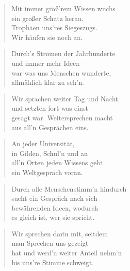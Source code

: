 \documentclass[10pt,a4paper]{article}
\begin{document}
\begin{multicols}{2}
\begin{verse}
Mit immer größ’rem Wissen wuchs \\
ein großer Schatz heran. \\
Trophäen uns’res Siegeszugs. \\
Wir häufen sie noch an. \\
\end{verse}

\begin{verse}
Durch’s Strömen der Jahrhunderte \\
und immer mehr Ideen \\
war was uns Menschen wunderte, \\
allmählich klar zu seh’n. \\
\end{verse}

\begin{verse}
Wir sprachen weiter Tag und Nacht \\
und setzten fort was einst \\
gesagt war. Weitersprechen macht \\
aus all’n Gesprächen eins. \\
\end{verse}

\begin{verse}
An jeder Universität, \\
in Gilden, Schul’n und an \\
all’n Orten jeden Wissens geht \\
ein Weltgespräch voran. \\
\end{verse}

\begin{verse}
Durch alle Menschenstimm’n hindurch \\
sucht ein Gespräch nach sich \\
bewährenden Ideen, wodurch \\
es gleich ist, wer sie spricht. \\
\end{verse}

\begin{verse}
Wir sprechen darin mit, seitdem \\
man Sprechen uns gezeigt \\
hat und werd’n weiter Anteil nehm’n \\
bis uns’re Stimme schweigt. \\
\end{verse}


\end{multicols}
\end{document}

